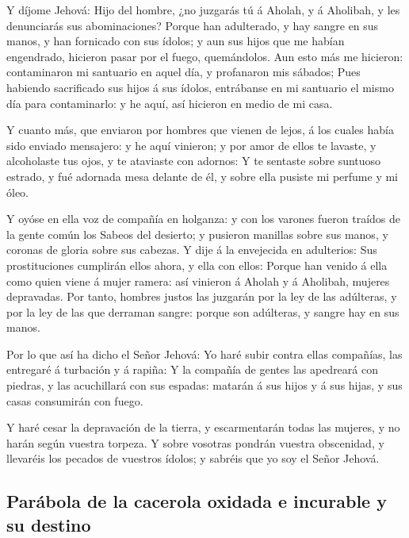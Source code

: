  Y díjome Jehová: Hijo del hombre, ¿no juzgarás tú á
Aholah, y á Aholibah, y les denunciarás sus abominaciones?
 Porque han adulterado, y hay sangre en sus manos, y han
fornicado con sus ídolos; y aun sus hijos que me habían engendrado,
hicieron pasar por el fuego, quemándolos.  Aun esto más
me hicieron: contaminaron mi santuario en aquel día, y profanaron mis
sábados;  Pues habiendo sacrificado sus hijos á sus
ídolos, entrábanse en mi santuario el mismo día para contaminarlo: y he
aquí, así hicieron en medio de mi casa.

 Y cuanto más, que enviaron por hombres que vienen de
lejos, á los cuales había sido enviado mensajero: y he aquí vinieron; y
por amor de ellos te lavaste, y alcoholaste tus ojos, y te ataviaste con
adornos:  Y te sentaste sobre suntuoso estrado, y fué
adornada mesa delante de él, y sobre ella pusiste mi perfume y mi óleo.

 Y oyóse en ella voz de compañía en holganza: y con los
varones fueron traídos de la gente común los Sabeos del desierto; y
pusieron manillas sobre sus manos, y coronas de gloria sobre sus
cabezas.  Y dije á la envejecida en adulterios: Sus
prostituciones cumplirán ellos ahora, y ella con ellos: 
Porque han venido á ella como quien viene á mujer ramera: así vinieron á
Aholah y á Aholibah, mujeres depravadas.  Por tanto,
hombres justos las juzgarán por la ley de las adúlteras, y por la ley de
las que derraman sangre: porque son adúlteras, y sangre hay en sus
manos.

 Por lo que así ha dicho el Señor Jehová: Yo haré subir
contra ellas compañías, las entregaré á turbación y á rapiña:
 Y la compañía de gentes las apedreará con piedras, y las
acuchillará con sus espadas: matarán á sus hijos y á sus hijas, y sus
casas consumirán con fuego.

 Y haré cesar la depravación de la tierra, y
escarmentarán todas las mujeres, y no harán según vuestra torpeza.
 Y sobre vosotras pondrán vuestra obscenidad, y llevaréis
los pecados de vuestros ídolos; y sabréis que yo soy el Señor Jehová.

\hypertarget{paruxe1bola-de-la-cacerola-oxidada-e-incurable-y-su-destino}{%
\subsection{Parábola de la cacerola oxidada e incurable y su
destino}\label{paruxe1bola-de-la-cacerola-oxidada-e-incurable-y-su-destino}}

